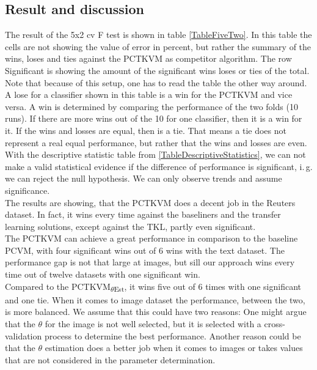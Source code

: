 \subsection{Result and discussion}\label{EmSubSecResOneDa}
The result of the 5x2 cv F test is shown in table \ref{TableFiveTwo}.
In this table the cells are not showing the value of error in percent, but rather the summary of the wins,  loses and ties against the \acs{PCTKVM} as competitor algorithm.
The row Significant is showing the amount of the significant wins loses or ties of the total.
Note that because of this setup, one has to read the table the other way around. 
A lose for a classifier shown in this table is a win for the \acs{PCTKVM} and vice versa. 
A win is determined by comparing the performance of the two folds (10 runs).
If there are more wins out of the 10 for one classifier, then it is a win for it. If the wins and losses are equal, then is a tie. 
That means a tie does not represent a real equal performance, but rather that the wins and losses are even.\\
With the descriptive statistic table from \ref{TableDescriptiveStatistics}, we can not make a valid statistical evidence if the difference of performance is significant, i.\,g. we can reject the null hypothesis.\cite[p. 9]{JanezDemsar.2006}
We can only observe trends and assume significance.\\
The results are showing, that the \acs{PCTKVM} does a decent job in the Reuters dataset.
In fact, it wins every time against the baseliners and the transfer learning solutions, except against the \acs{TKL}, partly even significant.\\
The \acs{PCTKVM} can achieve a great performance in comparison to the baseline \acs{PCVM}, with four significant wins out of 6 wins with the text dataset.
The performance gap is not that large at images, but sill our approach wins every time out of twelve datasets with one significant win.\\
Compared to the \acs{PCTKVM}\textsubscript{$\theta$Est}, it wins five out of 6 times with one significant and one tie. 
When it comes to image dataset the performance, between the two, is more balanced.
We assume that this could have two reasons:
One might argue that the $\theta$ for the image is not well selected, but it is selected with a cross-validation process to determine the best performance. Another reason could be that the $\theta$ estimation does a better job when it comes to images or takes values that are not considered in the parameter determination.\\
